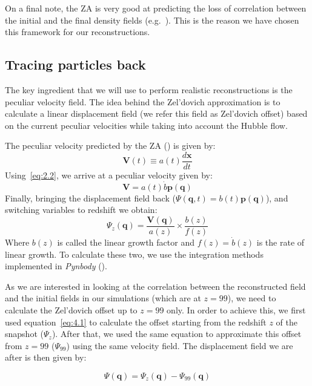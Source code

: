 On a final note, the ZA is very good at predicting the loss of correlation between the initial and the final density fields (e.g.~\cite{2016PhRvD..93j3519P}). This is the reason we have chosen this framework for our reconstructions.


\subsection{Tracing particles back}

The key ingredient that we will use to perform realistic reconstructions is the peculiar velocity field. The idea behind the Zel'dovich approximation is to calculate a linear displacement field (we refer this field as Zel'dovich offset) based on the current peculiar velocities while taking into account the Hubble flow. 

The peculiar velocity predicted by the ZA (\cite{1993sfu..book.....P}) is given by:
\begin{equation}
    \textbf{V}(t) \equiv a(t)\frac{d\textbf{x}}{dt}    
\end{equation}
Using~\ref{eq:2.2}, we arrive at a peculiar velocity given by:
\begin{equation}
    \textbf{V} = a(t)\dot{b}\textbf{p}(\textbf{q})
\end{equation}
Finally, bringing the displacement field back ($\Psi(\textbf{q},t) = b(t) \textbf{p}(\textbf{q})$), and switching variables to redshift we obtain:
\begin{equation}
    \Psi_z(\textbf{q}) = \frac{\textbf{V}(\textbf{q})}{a(z)} \times \frac{b(z)}{f(z)}
    \label{eq:4.1}
\end{equation} 
Where $b(z)$ is called the linear growth factor and $f(z) = \dot{b}(z)$ is the rate of linear growth. To calculate these two, we use the integration methods implemented in \textit{Pynbody} (\cite{2013ascl.soft05002P}).

As we are interested in looking at the correlation between the reconstructed field  and the initial fields in our simulations (which are at $z=99$), we need to calculate the Zel'dovich offset up to $z=99$ only. In order to achieve this, we first used equation~\ref{eq:4.1} to calculate the offset starting from the redshift $z$ of the snapshot ($\Psi_z$). After that, we used the same equation to approximate this offset from $z=99$ ($\Psi_{99}$) using the same velocity field. The displacement field we are after is then given by:

\begin{equation}
    \Psi(\textbf{q}) = \Psi_z(\textbf{q}) - \Psi_{99}(\textbf{q})
    \label{eq:4.2}
\end{equation}


